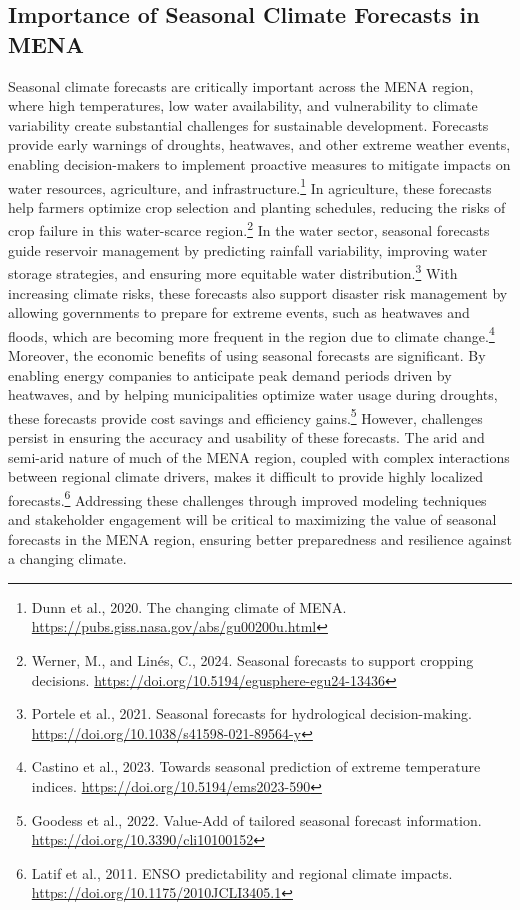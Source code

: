 \subsection{Importance of Seasonal Climate Forecasts in MENA}
Seasonal climate forecasts are critically important across the MENA region, where high temperatures, low water availability, and vulnerability to climate variability create substantial challenges for sustainable development. Forecasts provide early warnings of droughts, heatwaves, and other extreme weather events, enabling decision-makers to implement proactive measures to mitigate impacts on water resources, agriculture, and infrastructure.\footnote{Dunn et al., 2020. The changing climate of MENA. \url{https://pubs.giss.nasa.gov/abs/gu00200u.html}} In agriculture, these forecasts help farmers optimize crop selection and planting schedules, reducing the risks of crop failure in this water-scarce region.\footnote{Werner, M., and Linés, C., 2024. Seasonal forecasts to support cropping decisions. \url{https://doi.org/10.5194/egusphere-egu24-13436}} In the water sector, seasonal forecasts guide reservoir management by predicting rainfall variability, improving water storage strategies, and ensuring more equitable water distribution.\footnote{Portele et al., 2021. Seasonal forecasts for hydrological decision-making. \url{https://doi.org/10.1038/s41598-021-89564-y}} With increasing climate risks, these forecasts also support disaster risk management by allowing governments to prepare for extreme events, such as heatwaves and floods, which are becoming more frequent in the region due to climate change.\footnote{Castino et al., 2023. Towards seasonal prediction of extreme temperature indices. \url{https://doi.org/10.5194/ems2023-590}} Moreover, the economic benefits of using seasonal forecasts are significant. By enabling energy companies to anticipate peak demand periods driven by heatwaves, and by helping municipalities optimize water usage during droughts, these forecasts provide cost savings and efficiency gains.\footnote{Goodess et al., 2022. Value-Add of tailored seasonal forecast information. \url{https://doi.org/10.3390/cli10100152}} However, challenges persist in ensuring the accuracy and usability of these forecasts. The arid and semi-arid nature of much of the MENA region, coupled with complex interactions between regional climate drivers, makes it difficult to provide highly localized forecasts.\footnote{Latif et al., 2011. ENSO predictability and regional climate impacts. \url{https://doi.org/10.1175/2010JCLI3405.1}} Addressing these challenges through improved modeling techniques and stakeholder engagement will be critical to maximizing the value of seasonal forecasts in the MENA region, ensuring better preparedness and resilience against a changing climate.


